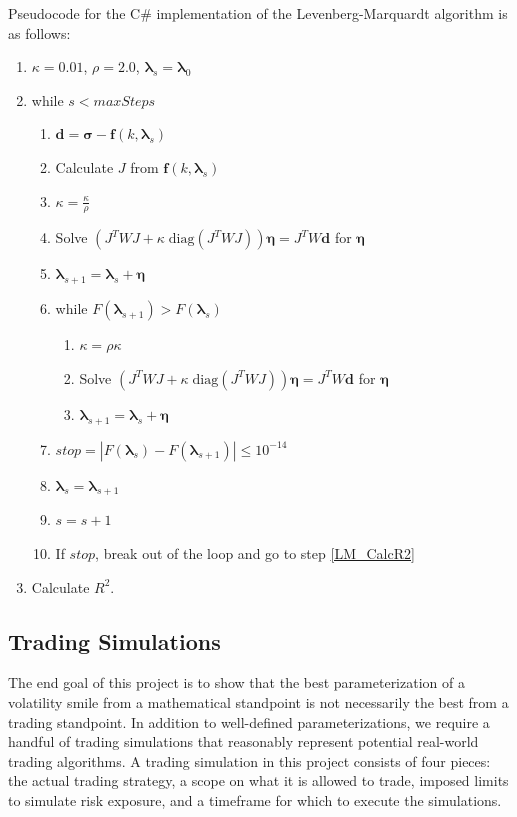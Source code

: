 \documentclass[12pt, a4paper, notitlepage]{article}
\numberwithin{equation}{subsection}
\numberwithin{figure}{subsection}
\numberwithin{table}{subsection}
\newcommand{\lambdaVect}{\pmb{\lambda}}
\begin{document}
Pseudocode for the C\# implementation of the Levenberg-Marquardt algorithm is as follows:

\begin{enumerate}
	\item $\kappa = 0.01$, $\rho = 2.0$, $\lambdaVect_s = \lambdaVect_0$
	\item while $s < maxSteps$
    	\begin{enumerate}
        	\item $\pmb{d} = \pmb{\sigma} - \pmb{f}(k, \pmb{\lambda}_{s})$
            \item Calculate $J$ from $\pmb{f}(k, \pmb{\lambda}_{s})$
            \item $\kappa = \frac{\kappa}{\rho}$
            \item Solve $\left(J^{T} W J + \kappa \; \text{diag}(J^{T} W J)\right) \pmb{\eta} = J^{T} W \pmb{d}$ for $\pmb{\eta}$
            \item $\lambdaVect_{s+1} = \pmb{\lambda}_{s} + \pmb{\eta}$
            \item while $F(\lambdaVect_{s+1}) > F(\pmb{\lambda}_{s})$
                    \begin{enumerate}
                        \item $\kappa = \rho \kappa$              
                        \item Solve $\left(J^{T} W J + \kappa \; \text{diag}(J^{T} W J)\right) \pmb{\eta} = J^{T} W \pmb{d}$ for $\pmb{\eta}$
                        \item $\lambdaVect_{s+1} = \pmb{\lambda}_{s} + \pmb{\eta}$
                    \end{enumerate}
            \item $stop = |F(\lambdaVect_{s}) - F(\lambdaVect_{s+1})| \leq 10^{-14}$
            \item $\pmb{\lambda}_{s} = \lambdaVect_{s+1}$
            \item $s = s + 1$
            \item If $stop$, break out of the loop and go to step \ref{LM_CalcR2}
    	\end{enumerate}
   \item Calculate $R^2$. \label{LM_CalcR2}
\end{enumerate}

\subsection{Trading Simulations}\label{sec:TradingStrategies}
The end goal of this project is to show that the best parameterization of a volatility smile from a mathematical standpoint is not necessarily the best from a trading standpoint.  In addition to well-defined parameterizations, we require a handful of trading simulations that reasonably represent potential real-world trading algorithms.  A trading simulation in this project consists of four pieces: the actual trading strategy, a scope on what it is allowed to trade, imposed limits to simulate risk exposure, and a timeframe for which to execute the simulations.
\end{document}
